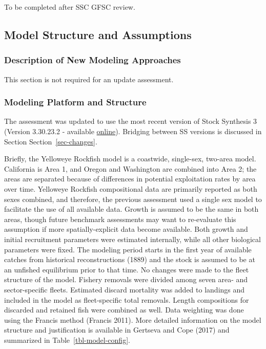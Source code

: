 \documentclass[
]{scrartcl}
\begin{document}
To be completed after SSC GFSC review.

\subsection{Model Structure and Assumptions}\label{sec-bridge}

\subsubsection{Description of New Modeling
Approaches}\label{description-of-new-modeling-approaches}

This section is not required for an update assessment.

\subsubsection{Modeling Platform and
Structure}\label{modeling-platform-and-structure}

The assessment was updated to use the most recent version of Stock
Synthesis 3 (Version 3.30.23.2 - available
\href{https://github.com/nmfs-ost/ss3-source-code/releases/tag/v3.30.23.2}{online}).
Bridging between SS versions is discussed in Section
Section~\ref{sec-changes}.

Briefly, the Yelloweye Rockfish model is a coastwide, single-sex,
two-area model. California is Area 1, and Oregon and Washington are
combined into Area 2; the areas are separated because of differences in
potential exploitation rates by area over time. Yelloweye Rockfish
compositional data are primarily reported as both sexes combined, and
therefore, the previous assessment used a single sex model to facilitate
the use of all available data. Growth is assumed to be the same in both
areas, though future benchmark assessments may want to re-evaluate this
assumption if more spatially-explicit data become available. Both growth
and initial recruitment parameters were estimated internally, while all
other biological parameters were fixed. The modeling period starts in
the first year of available catches from historical reconstructions
(1889) and the stock is assumed to be at an unfished equilibrium prior
to that time. No changes were made to the fleet structure of the model.
Fishery removals were divided among seven area- and sector-specific
fleets. Estimated discard mortality was added to landings and included
in the model as fleet-specific total removals. Length compositions for
discarded and retained fish were combined as well. Data weighting was
done using the Francis method (Francis 2011). More detailed information
on the model structure and justification is available in Gertseva and
Cope (2017) and summarized in Table~\ref{tbl-model-config}.
\end{document}
